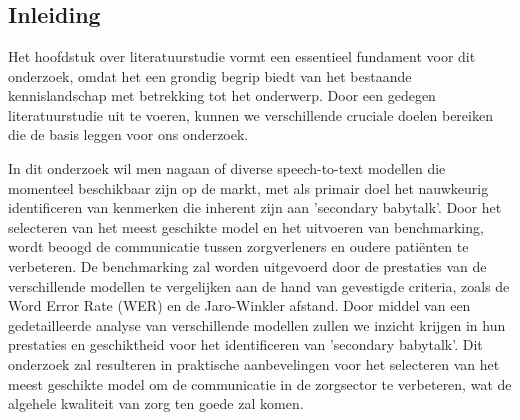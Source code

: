 \chapter{}%
\label{ch:stand-van-zaken}


\section{Inleiding}


Het hoofdstuk over literatuurstudie vormt een essentieel fundament voor dit onderzoek, omdat het een grondig begrip biedt van het bestaande kennislandschap met betrekking tot het onderwerp. Door een gedegen literatuurstudie uit te voeren, kunnen we verschillende cruciale doelen bereiken die de basis leggen voor ons onderzoek.

In dit onderzoek wil men nagaan of diverse speech-to-text modellen die momenteel beschikbaar zijn op de markt, met als primair doel het nauwkeurig identificeren van kenmerken die inherent zijn aan 'secondary babytalk'. Door het selecteren van het meest geschikte model en het uitvoeren van benchmarking, wordt beoogd de communicatie tussen zorgverleners en oudere patiënten te verbeteren. De benchmarking zal worden uitgevoerd door de prestaties van de verschillende modellen te vergelijken aan de hand van gevestigde criteria, zoals de Word Error Rate (WER) en de Jaro-Winkler afstand. 
Door middel van een gedetailleerde analyse van verschillende modellen zullen we inzicht krijgen in hun prestaties en geschiktheid voor het identificeren van 'secondary babytalk'. Dit onderzoek zal resulteren in praktische aanbevelingen voor het selecteren van het meest geschikte model om de communicatie in de zorgsector te verbeteren, wat de algehele kwaliteit van zorg ten goede zal komen.


